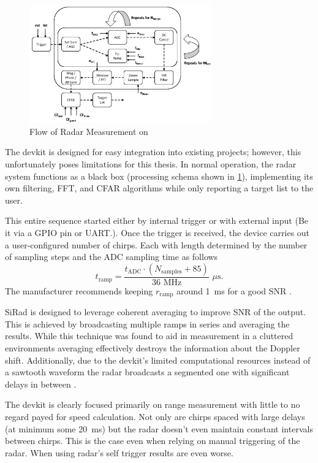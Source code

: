 \begin{figure}[h!]
  \centering
  \includegraphics[width=0.7\textwidth]{../img/sidar_flow.png}
  \caption[Flow of Radar Measurement on \sidar \cite{sidarPRO}]{Flow of Radar Measurement on \sidar \cite{sidarPRO}}
  \label{fig:sidarFlow}
\end{figure}

The devkit is designed for easy integration into existing projects; however, this unfortunately poses limitations for this thesis.
In normal operation, the radar system functions as a black box (processing schema shown in \ref{fig:sidarFlow}), implementing its own filtering, FFT, and CFAR algorithms while only reporting a target list to the user.

This entire sequence started either by internal trigger or with external input (Be it via a GPIO pin or UART.).
Once the trigger is received, the device carries out a user-configured number of chirps.
Each with length determined by the number of sampling steps and the ADC sampling time as follows
\begin{equation}
  t_\mathrm{ramp} = \frac{t_\mathrm{ADC} \cdot  (N_\mathrm{samples} + 85)}{36\,\, \mathrm{MHz}} \,\, \mu\mathrm{s}.
  \label{eq:sampling}
\end{equation}
The manufacturer recommends keeping $r_\mathrm{ramp}$ around 1~ms for a good SNR \cite{sidarPRO}.

SiRad is designed to leverage coherent averaging to improve SNR of the output.
This is achieved by broadcasting multiple ramps in series and averaging the results.
While this technique was found to aid in measurement in a cluttered environments averaging effectively destroys the information about the Doppler shift.
Additionally, due to the devkit's limited computational resources instead of a sawtooth waveform the radar broadcasts a segmented one with significant delays in between \cite{sidarPRO}.

The devkit is clearly focused primarily on range measurement with little to no regard payed for speed calculation.
Not only are chirps spaced with large delays (at minimum some 20~ms) but the radar doesn't even maintain constant intervals between chirps.
This is the case even when relying on manual triggering of the radar.
When using radar's self trigger results are even worse.


